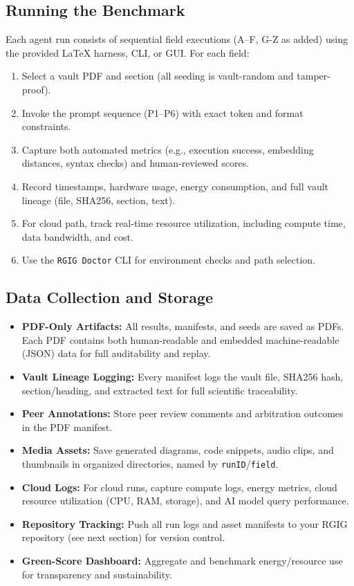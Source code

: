 \documentclass[11pt]{article}
\begin{document}
\subsection*{Running the Benchmark}
Each agent run consists of sequential field executions (A–F, G-Z as added) using the provided LaTeX harness, CLI, or GUI. For each field:
\begin{enumerate}
  \item Select a vault PDF and section (all seeding is vault-random and tamper-proof).
  \item Invoke the prompt sequence (P1–P6) with exact token and format constraints.
  \item Capture both automated metrics (e.g., execution success, embedding distances, syntax checks) and human-reviewed scores.
  \item Record timestamps, hardware usage, energy consumption, and full vault lineage (file, SHA256, section, text).
  \item For cloud path, track real-time resource utilization, including compute time, data bandwidth, and cost.
  \item Use the \texttt{RGIG Doctor} CLI for environment checks and path selection.
\end{enumerate}

\subsection*{Data Collection and Storage}
\begin{itemize}
  \item \textbf{PDF-Only Artifacts:} All results, manifests, and seeds are saved as PDFs. Each PDF contains both human-readable and embedded machine-readable (JSON) data for full auditability and replay.
  \item \textbf{Vault Lineage Logging:} Every manifest logs the vault file, SHA256 hash, section/heading, and extracted text for full scientific traceability.
  \item \textbf{Peer Annotations:} Store peer review comments and arbitration outcomes in the PDF manifest.
  \item \textbf{Media Assets:} Save generated diagrams, code snippets, audio clips, and thumbnails in organized directories, named by \texttt{runID}/\texttt{field}.
  \item \textbf{Cloud Logs:} For cloud runs, capture compute logs, energy metrics, cloud resource utilization (CPU, RAM, storage), and AI model query performance.
  \item \textbf{Repository Tracking:} Push all run logs and asset manifests to your RGIG repository (see next section) for version control.
  \item \textbf{Green-Score Dashboard:} Aggregate and benchmark energy/resource use for transparency and sustainability.
\end{itemize}
\end{document}
